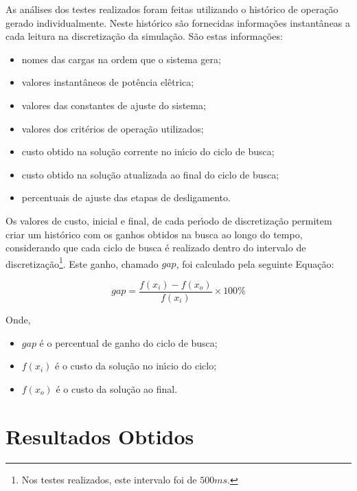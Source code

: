 As an{\'a}lises dos testes realizados foram feitas utilizando o hist{\'o}rico de opera{\c c}{\~a}o gerado individualmente. Neste hist{\'o}rico s{\~a}o fornecidas informa{\c c}{\~o}es instant{\^a}neas a cada leitura na discretiza{\c c}{\~a}o da simula{\c c}{\~a}o. S{\~a}o estas informa{\c c}{\~o}es:

\begin{itemize}
    \item nomes das cargas na ordem que o sistema gera;
    \item valores instant{\^a}neos de pot{\^e}ncia el{\^e}trica;
    \item valores das constantes de ajuste do sistema;
    \item valores dos crit{\'e}rios de opera{\c c}{\~a}o utilizados;
    \item custo obtido na solu{\c c}{\~a}o corrente no in{\'\i}cio do ciclo de busca;
    \item custo obtido na solu{\c c}{\~a}o atualizada ao final do ciclo de busca;
    \item percentuais de ajuste das etapas de desligamento.
\end{itemize}

Os valores de custo, inicial e final, de cada per{\'\i}odo de discretiza{\c c}{\~a}o permitem criar um hist{\'o}rico com os ganhos obtidos na busca ao longo do tempo, considerando que cada ciclo de busca {\'e} realizado dentro do intervalo de discretiza{\c c}{\~a}o\footnote{Nos testes realizados, este intervalo foi de $500ms$.}. Este ganho, chamado $gap$, foi calculado pela seguinte Equa{\c c}{\~a}o:

\begin{equation} \label{eq:gap}
    gap = \frac{f\left( x_{i} \right) - f\left( x_{o} \right)}{f\left( x_{i} \right)} \times 100\%
\end{equation}

Onde,

\begin{itemize}
    \item[] $gap$ {\'e} o percentual de ganho do ciclo de busca;
    \item[] $f\left( x_{i} \right)$ {\'e} o custo da solu{\c c}{\~a}o no in{\'\i}cio do ciclo;
    \item[] $f\left( x_{o} \right)$ {\'e} o custo da solu{\c c}{\~a}o ao final.
\end{itemize}

\section{Resultados Obtidos} \label{sec:result}

